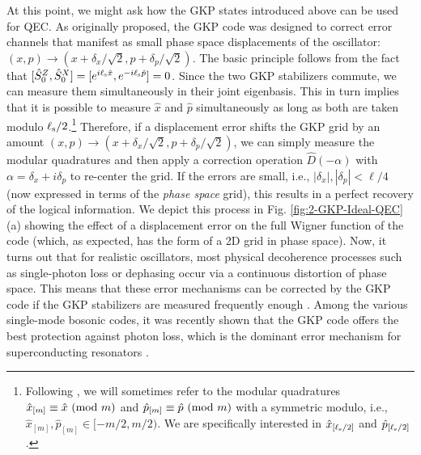 At this point, we might ask how the GKP states introduced above can be used for QEC. As originally proposed, the GKP code was designed to correct error channels that manifest as small phase space displacements of the oscillator: $(x, p) \to (x + \delta_x/\sqrt{2}, p+\delta_p/\sqrt{2})$. The basic principle follows from the fact that $[\hat{S}_0^Z, \hat{S}_0^X] = [e^{i\ell_{\rm s}\hat{x}}, e^{-i\ell_{\rm s}\hat{p}}] = 0$. Since the two GKP stabilizers commute, we can measure them simultaneously in their joint eigenbasis. This in turn implies that it is possible to measure $\hat{x}$ and $\hat{p}$ simultaneously as long as both are taken modulo $\ell_{\rm s}/2$.\footnote{Following \cite{royer2020gkp}, we will sometimes refer to the modular quadratures $\hat{x}_{[m]} \equiv \hat{x} \ (\mathrm{mod}\ m)$ and $\hat{p}_{[m]} \equiv \hat{p} \ (\mathrm{mod}\ m)$ with a symmetric modulo, i.e., $\hat{x}_{[m]}, \hat{p}_{[m]} \in [-m/2, m/2)$. We are specifically interested in $\hat{x}_{[\ell_{\rm s}/2]}$ and $\hat{p}_{[\ell_{\rm s}/2]}$.} Therefore, if a displacement error shifts the GKP grid by an amount $(x, p) \to (x + \delta_x/\sqrt{2}, p+\delta_p/\sqrt{2})$, we can simply measure the modular quadratures and then apply a correction operation $\hat{D}(-\alpha)$ with $\alpha = \delta_x + i\delta_p$ to re-center the grid. If the errors are small, i.e., $|\delta_x|, |\delta_p| < \ell / 4$ (now expressed in terms of the \textit{phase space} grid), this results in a perfect recovery of the logical information. We depict this process in Fig. \ref{fig:2-GKP-Ideal-QEC}(a) showing the effect of a displacement error on the full Wigner function of the code (which, as expected, has the form of a 2D grid in phase space). Now, it turns out that for realistic oscillators, most physical decoherence processes such as single-photon loss or dephasing occur via a continuous distortion of phase space. This means that these error mechanisms can be corrected by the GKP code if the GKP stabilizers are measured frequently enough \cite{gottesman2001gkp, glancy2006gkperror, albert2018performance-and-structure, noh2018performance-and-structure-pt2}. Among the various single-mode bosonic codes, it was recently shown that the GKP code offers the best protection against photon loss, which is the dominant error mechanism for superconducting resonators \cite{albert2018performance-and-structure}. 
